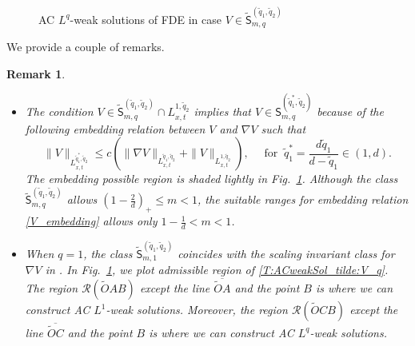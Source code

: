 \documentclass{amsart}
\newtheorem{remark}[defn]{Remark}
\numberwithin{equation}{section}
\begin{document}
\begin{figure}
\caption{\footnotesize  AC $L^q$-weak solutions of FDE in case $V\in \tilde{\mathsf{S}}_{m,q}^{(\tilde{q}_1, \tilde{q}_2)}$}
\label{F:tilde_S:weak}
\end{figure}

We provide a couple of remarks. 
\begin{remark}
	\begin{itemize}
		\item [(i)] The condition $V \in \tilde{\mathsf{S}}_{m,q}^{(\tilde{q}_1, \tilde{q}_2)} \cap L_{x,t}^{1, \tilde{q}_2}$ implies that $V\in \mathsf{S}_{m,q}^{(\tilde{q}_{1}^{\ast}, \tilde{q}_2)}$ because of the following embedding relation between $V$ and $\nabla V$ such that 
			\begin{equation}\label{V_embedding}
			\|V\|_{L_{x,t}^{\tilde{q}_{1}^{\ast},\tilde{q}_2}} \leq c \left(\|\nabla V\|_{L_{x,t}^{\tilde{q}_1,\tilde{q}_2}} + \|V\|_{L_{x,t}^{1, \tilde{q}_2}}\right), \quad \text{ for } \ \tilde{q}_{1}^{\ast} = \frac{d \tilde{q}_1}{ d - \tilde{q}_1} \in (1,d).
			\end{equation}
			The embedding possible region is shaded lightly in Fig.~\ref{F:tilde_S:weak}. 
			Although the class $\tilde{\mathsf{S}}_{m,q}^{(\tilde{q}_1, \tilde{q}_2)}$ allows $(1-\frac{2}{d})_{+} \leq m<1$, the suitable ranges for embedding relation \eqref{V_embedding} allows only $ 1-\frac{1}{d} < m<1$.
			
		\item[(ii)] When $q=1$, the class $\tilde{\mathsf{S}}_{m,1}^{(\tilde{q}_1, \tilde{q}_2)}$ coincides with the scaling invariant class for $\nabla V$ in \cite{HKK01,HKK02}. In Fig.~\ref{F:tilde_S:weak}, we plot admissible region of \eqref{T:ACweakSol_tilde:V_q}. The region $\mathcal{R}(\tilde{O}AB)$ except the line $\overline{\tilde{O}A}$ and the point $B$ is where we can construct AC $L^1$-weak solutions. Moreover, the region $\mathcal{R}(\tilde{O}CB)$ except the line $\overline{\tilde{O} C}$ and the point $B$ is where we can construct AC $L^q$-weak solutions.  
	\end{itemize}
\end{remark}
\end{document}
